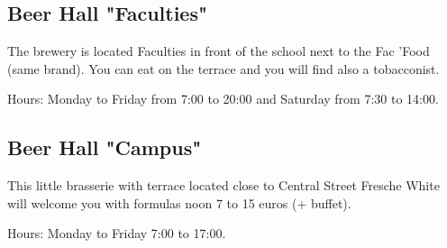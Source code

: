 
\subsection {Beer Hall "Faculties"}
The brewery is located Faculties in front of the school next to the Fac 'Food (same brand).
You can eat on the terrace and you will find also a tobacconist.

Hours: Monday to Friday from 7:00 to 20:00 and Saturday from 7:30 to 14:00.



\subsection {Beer Hall "Campus"}
This little brasserie with terrace located close to Central Street Fresche White will welcome you with formulas noon 7 to 15 euros (+ buffet).

Hours: Monday to Friday 7:00 to 17:00.


